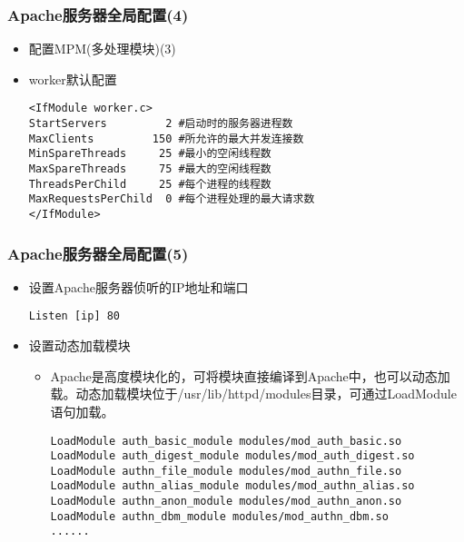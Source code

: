 \documentclass[xcolor=svgnames,presentation]{beamer}
\begin{document}
\begin{frame}[fragile]
\frametitle{Apache服务器全局配置(4)}
\label{sec-1-7}
\begin{itemize}

\item 配置MPM(多处理模块)(3)
\label{sec-1-7-1}%

\item worker默认配置\\
\label{sec-1-7-2}%
\begin{verbatim}
<IfModule worker.c>
StartServers         2 #启动时的服务器进程数
MaxClients         150 #所允许的最大并发连接数
MinSpareThreads     25 #最小的空闲线程数
MaxSpareThreads     75 #最大的空闲线程数
ThreadsPerChild     25 #每个进程的线程数
MaxRequestsPerChild  0 #每个进程处理的最大请求数
</IfModule>
\end{verbatim}
\end{itemize} %
\end{frame}
\begin{frame}[fragile]
\frametitle{Apache服务器全局配置(5)}
\label{sec-1-8}
\begin{itemize}

\item 设置Apache服务器侦听的IP地址和端口\\
\label{sec-1-8-1}%
\begin{verbatim}
Listen [ip] 80
\end{verbatim}

\item 设置动态加载模块
\label{sec-1-8-2}%
\begin{itemize}

\item Apache是高度模块化的，可将模块直接编译到Apache中，也可以动态加载。动态加载模块位于/usr/lib/httpd/modules目录，可通过LoadModule语句加载。\\
\label{sec-1-8-2-1}%
\begin{verbatim}
LoadModule auth_basic_module modules/mod_auth_basic.so
LoadModule auth_digest_module modules/mod_auth_digest.so
LoadModule authn_file_module modules/mod_authn_file.so
LoadModule authn_alias_module modules/mod_authn_alias.so
LoadModule authn_anon_module modules/mod_authn_anon.so
LoadModule authn_dbm_module modules/mod_authn_dbm.so
......
\end{verbatim}
\end{itemize} %
\end{itemize} %
\end{frame}
\end{document}
